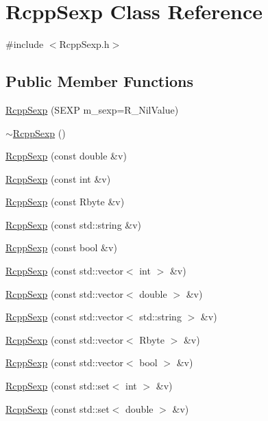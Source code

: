 \hypertarget{classRcppSexp}{
\section{RcppSexp Class Reference}
\label{classRcppSexp}
}


{\ttfamily \#include $<$RcppSexp.h$>$}\subsection*{Public Member Functions}
\begin{DoxyCompactItemize}
\item 
\hyperlink{classRcppSexp_a37253a883401c9714dbd3ec50e0f78a1}{RcppSexp} (SEXP m\_\-sexp=R\_\-NilValue)
\item 
\hyperlink{classRcppSexp_a54cb551beed3570ca0a1aa0566d512cf}{$\sim$RcppSexp} ()
\item 
\hyperlink{classRcppSexp_acf6fc00ffd9616dea4926baf40e6f77d}{RcppSexp} (const double \&v)
\item 
\hyperlink{classRcppSexp_a2ddf3900d04a52a59e15faebe83a4e8b}{RcppSexp} (const int \&v)
\item 
\hyperlink{classRcppSexp_a325df76d427552cf1bb2d010311b8d21}{RcppSexp} (const Rbyte \&v)
\item 
\hyperlink{classRcppSexp_a0876ffb6bdb82d6fe2f30a6a73d51dbb}{RcppSexp} (const std::string \&v)
\item 
\hyperlink{classRcppSexp_a57010f894bd69c42720edd71198a266c}{RcppSexp} (const bool \&v)
\item 
\hyperlink{classRcppSexp_ab276f77e2cc03da2d60d8826d095d757}{RcppSexp} (const std::vector$<$ int $>$ \&v)
\item 
\hyperlink{classRcppSexp_addfe0bf529d5adc8cfd3729035676cf1}{RcppSexp} (const std::vector$<$ double $>$ \&v)
\item 
\hyperlink{classRcppSexp_a72d7ac372a23dcb2d8e7752afc7f07ac}{RcppSexp} (const std::vector$<$ std::string $>$ \&v)
\item 
\hyperlink{classRcppSexp_a1cc2afc964adeae614802949199e4383}{RcppSexp} (const std::vector$<$ Rbyte $>$ \&v)
\item 
\hyperlink{classRcppSexp_ad953b65f5ea98d7519b51f1f56c8847a}{RcppSexp} (const std::vector$<$ bool $>$ \&v)
\item 
\hyperlink{classRcppSexp_ab11056882afe3cf2c904003b63f6ac99}{RcppSexp} (const std::set$<$ int $>$ \&v)
\item 
\hyperlink{classRcppSexp_ab7e14928df338b3d0280685bf89c0af4}{RcppSexp} (const std::set$<$ double $>$ \&v)

\end{DoxyCompactItemize}
